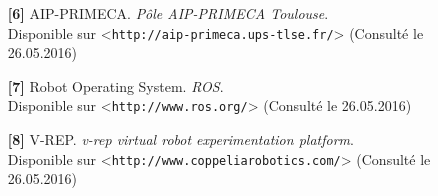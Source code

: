 \documentclass[a4paper,french, titlepage]{book}
\begin{document}
\begin{itemize}
\item[ ]
\item[ \textbf{[6]} ] AIP-PRIMECA. \textit{Pôle AIP-PRIMECA Toulouse}.\\
Disponible sur <\verb!http://aip-primeca.ups-tlse.fr/!> (Consulté le 26.05.2016)
\item[ ]
\item[ \textbf{[7]} ] Robot Operating System. \textit{ROS}.\\
Disponible sur <\verb!http://www.ros.org/!> (Consulté le 26.05.2016)
\item[ ]
\item[ \textbf{[8]} ] V-REP. \textit{v-rep virtual robot experimentation platform}.\\
Disponible sur <\verb!http://www.coppeliarobotics.com/!> (Consulté le 26.05.2016)
\item[ ]
\end{itemize}
\end{document}

